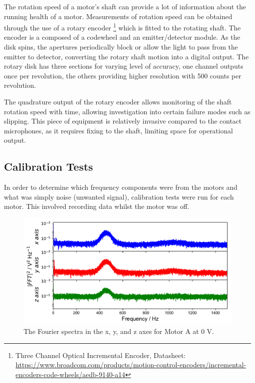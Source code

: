 The rotation speed of a motor's shaft can provide a lot of information about the running health of a motor. Measurements of rotation speed can be obtained through the use of a rotary encoder \footnote{Three Channel Optical Incremental Encoder, Datasheet: \url{https://www.broadcom.com/products/motion-control-encoders/incremental-encoders-code-wheels/aedb-9140-a14}} which is fitted to the rotating shaft. The encoder is a composed of a codewheel and an emitter/detector module. As the disk spins, the apertures periodically block or allow the light to pass from the emitter to detector, converting the rotary shaft motion into a digital output. The rotary disk has three sections for varying level of accuracy, one channel outputs once per revolution, the others providing higher resolution with 500 counts per revolution.

The quadrature output of the rotary encoder allows monitoring of the shaft rotation speed with time, allowing investigation into certain failure modes such as slipping. This piece of equipment is relatively invasive compared to the contact microphones, as it requires fixing to the shaft, limiting space for operational output. 

\subsection{Calibration Tests}

In order to determine which frequency components were from the motors and what was simply noise (unwanted signal), calibration tests were run for each motor. This involved recording data whilst the motor was off. 

\begin{figure}[t]
    \includegraphics[width=1.0\textwidth]{fig/freq_large_0V.pdf}
    \caption[Calibration Frequency 1]{The Fourier spectra in the x, y, and z axes for Motor A at 0 V.}
    \label{fig:freq_large0V}
\end{figure}

